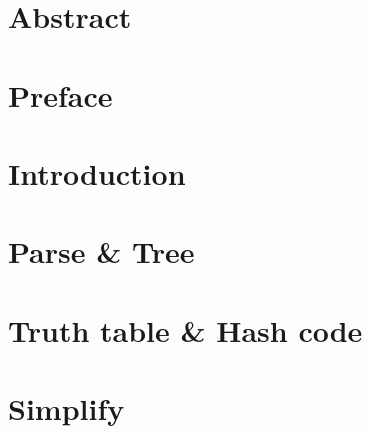 \documentclass[a4paper,10pt,twoside]{report}
\author{\me}
\begin{document}


\normalsize

\clearemptydoublepage

\chapter*{Abstract}\label{chapter:abstract}


\clearemptydoublepage

\chapter*{Preface}\label{chapter:preface}


\clearemptydoublepage

\tableofcontents

\clearemptydoublepage

\listoffigures

\clearemptydoublepage



\chapter{Introduction}\label{chapter:introduction}
\setcounter{page}{0}


\clearemptydoublepage

\chapter{Parse \& Tree}\label{chapter:parse_tree}


\clearemptydoublepage

\chapter{Truth table \& Hash code}\label{chapter:truth_table_hash_code}


\clearemptydoublepage

\chapter{Simplify}\label{chapter:simplify}

\end{document}
